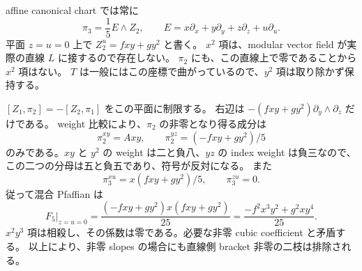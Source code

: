 affine canonical chart では常に
\[
\pi_3=\frac15E\wedge Z_2,\qquad
E=x\partial_x+y\partial_y+z\partial_z+u\partial_u.
\]
平面 $z=u=0$ 上で $Z_2^u=fxy+gy^2$ と書く。
$x^2$ 項は、modular vector field が実際の直線 $L$ に接するので存在しない。
$\pi_2$ にも、この直線上で零であることから $x^2$ 項はない。
$T$ は一般にはこの座標で曲がっているので、$y^2$ 項は取り除かず保持する。

$[Z_1,\pi_2]=-[Z_2,\pi_1]$ をこの平面に制限する。
右辺は $-(fxy+gy^2)\partial_y\wedge\partial_z$ だけである。
weight 比較により、$\pi_2$ の非零となり得る成分は
\[
\pi_2^{xy}=Axy,\qquad
\pi_2^{yz}=(-fxy+gy^2)/5
\]
のみである。$xy$ と $y^2$ の weight は二と負八、$yz$ の index weight は負三なので、
この二つの分母は五と負五であり、符号が反対になる。
また
\[
\pi_3^{xu}=x(fxy+gy^2)/5,\qquad \pi_3^{zu}=0.
\]
従って混合 Pfaffian は
\[
F_5|_{z=u=0}
=\frac{(-fxy+gy^2)x(fxy+gy^2)}{25}
=\frac{-f^2x^3y^2+g^2xy^4}{25}.
\]
$x^2y^3$ 項は相殺し、その係数は零である。必要な非零 cubic coefficient と矛盾する。
以上により、非零 slopes の場合にも直線側 bracket 非零の二枝は排除される。
